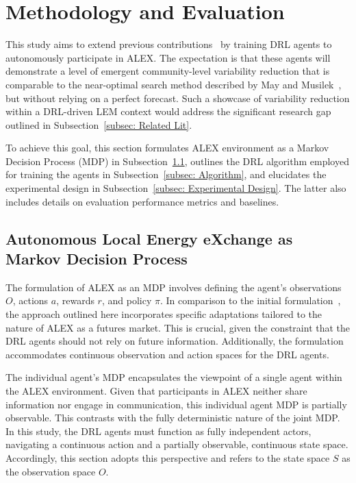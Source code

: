 \documentclass[preprint, 12pt]{elsarticle}
\begin{document}
\section{Methodology and Evaluation}\label{sec: Methodology}

This study aims to extend previous contributions~\cite{ALEXV1, ALEXV2} by training DRL agents to autonomously participate in ALEX. The expectation is that these agents will demonstrate a level of emergent community-level variability reduction that is comparable to the near-optimal search method described by May and Musilek~\cite{ALEXV2}, but without relying on a perfect forecast. Such a showcase of variability reduction within a DRL-driven LEM context would address the significant research gap outlined in Subsection~\ref{subsec: Related Lit}.

To achieve this goal, this section formulates ALEX environment as a Markov Decision Process (MDP) in Subsection~\ref{subsec: ALEXMDP}, outlines the DRL algorithm employed for training the agents in Subsection~\ref{subsec: Algorithm}, and elucidates the experimental design in Subsection~\ref{subsec: Experimental Design}. The latter also includes details on evaluation performance metrics and baselines.

\subsection{Autonomous Local Energy eXchange as Markov Decision Process}\label{subsec: ALEXMDP}

The formulation of ALEX as an MDP involves defining the agent's observations $O$, actions $a$, rewards $r$, and policy $\pi$. In comparison to the initial formulation~\cite{ALEXV2}, the approach outlined here incorporates specific adaptations tailored to the nature of ALEX as a futures market. This is crucial, given the constraint that the DRL agents should not rely on future information. Additionally, the formulation accommodates continuous observation and action spaces for the DRL agents.

The individual agent's MDP encapsulates the viewpoint of a single agent within the ALEX environment. Given that participants in ALEX neither share information nor engage in communication, this individual agent MDP is partially observable. This contrasts with the fully deterministic nature of the joint MDP. In this study, the DRL agents must function as fully independent actors, navigating a continuous action and a partially observable, continuous state space. Accordingly, this section adopts this perspective and refers to the state space $S$ as the observation space $O$.
\end{document}
